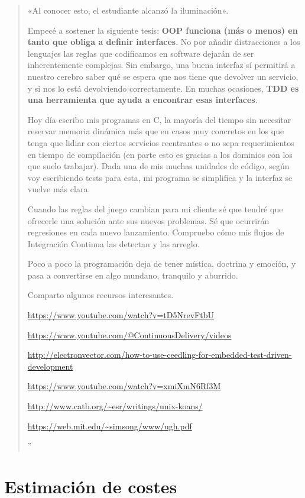 \begin{quote}
{    «Al conocer esto, el estudiante alcanzó la iluminación».

    Empecé a sostener la siguiente tesis: \textbf{OOP funciona (más o menos) en tanto
    que obliga a definir interfaces}. No por añadir distracciones a los lenguajes las
    reglas que codificamos en software dejarán de ser inherentemente complejas.
    Sin embargo, una buena interfaz sí permitirá a nuestro cerebro saber qué se espera
    que nos tiene que devolver un servicio, y si nos lo está devolviendo correctamente.
    En muchas ocasiones, \textbf{TDD es una herramienta que ayuda a encontrar esas
    interfaces}.

    Hoy día escribo mis programas en C, la mayoría del tiempo sin necesitar reservar
    memoria dinámica más que en casos muy concretos en los que tenga que lidiar con
    ciertos servicios reentrantes o no sepa requerimientos en tiempo de compilación
    (en parte esto es gracias a los dominios con los que suelo trabajar). Dada una
    de mis muchas unidades de código, según voy escribiendo tests para esta, mi
    programa se simplifica y la interfaz se vuelve más clara.

    Cuando las reglas del juego cambian para mi cliente sé que tendré que ofrecerle
    una solución ante sus nuevos problemas. Sé que ocurrirán regresiones en cada nuevo
    lanzamiento. Compruebo cómo mis flujos de Integración Continua las detectan y las arreglo.

    Poco a poco la programación deja de tener mística, doctrina y emoción, y pasa a
    convertirse en algo mundano, tranquilo y aburrido.

    Comparto algunos recursos interesantes.

    \url{https://www.youtube.com/watch?v=tD5NrevFtbU}

    \url{https://www.youtube.com/@ContinuousDelivery/videos}

    \url{http://electronvector.com/how-to-use-ceedling-for-embedded-test-driven-development}

    \url{https://www.youtube.com/watch?v=xmiXmN6Rf3M}

    \url{http://www.catb.org/~esr/writings/unix-koans/}

    \url{https://web.mit.edu/~simsong/www/ugh.pdf}%
}''
\end{quote}

\section{Estimación de costes}

